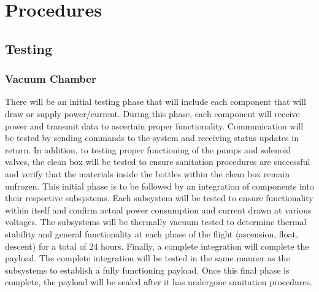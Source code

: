 \section{Procedures}
\label{sec:Procedures}





\subsection{Testing}

\subsubsection{Vacuum Chamber}
There will be an initial testing phase that will include each component that will draw or supply power/current. During this phase, each component will receive power and transmit data to ascertain proper functionality. Communication will be tested by sending commands to the system and receiving status updates in return. In addition, to testing proper functioning of the pumps and solenoid valves, the clean box will be tested to ensure sanitation procedures are successful and verify that the materials inside the bottles within the clean box remain unfrozen. This initial phase is to be followed by an integration of components into their respective subsystems. Each subsystem will be tested to ensure functionality within itself and confirm actual power consumption and current drawn at various voltages. The subsystems will be thermally vacuum tested to determine thermal stability and general functionality at each phase of the flight (ascension, float, descent) for a total of 24 hours. Finally, a complete integration will complete the payload. The complete integration will be tested in the same manner as the subsystems to establish a fully functioning payload. Once this final phase is complete, the payload will be sealed after it has undergone sanitation procedures.

